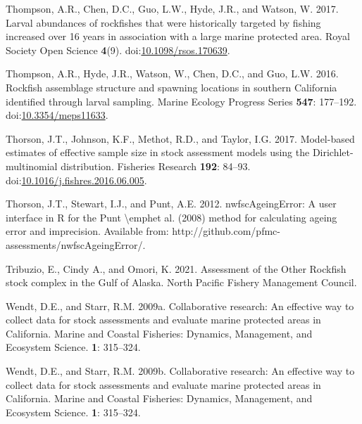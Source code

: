 \documentclass[11pt,
  english,
  letterpaper,
]{article}
\newlength{\cslhangindent}
\newenvironment{CSLReferences}[2] %
 {%
  \setlength{\parindent}{0pt}
  \ifodd #1 \everypar{\setlength{\hangindent}{\cslhangindent}}\ignorespaces\fi
  \ifnum #2 > 0
  \setlength{\parskip}{#2\baselineskip}
  \fi
 }%
 {}
\begin{document}
\begin{CSLReferences}{1}{0}
\leavevmode{}%
Thompson, A.R., Chen, D.C., Guo, L.W., Hyde, J.R., and Watson, W. 2017. Larval abundances of rockfishes that were historically targeted by fishing increased over 16 years in association with a large marine protected area. Royal Society Open Science \textbf{4}(9). doi:\href{https://doi.org/10.1098/rsos.170639}{10.1098/rsos.170639}.

\leavevmode{}%
Thompson, A.R., Hyde, J.R., Watson, W., Chen, D.C., and Guo, L.W. 2016. Rockfish assemblage structure and spawning locations in southern {California} identified through larval sampling. Marine Ecology Progress Series \textbf{547}: 177--192. doi:\href{https://doi.org/10.3354/meps11633}{10.3354/meps11633}.

\leavevmode{}%
Thorson, J.T., Johnson, K.F., Methot, R.D., and Taylor, I.G. 2017. Model-based estimates of effective sample size in stock assessment models using the {Dirichlet}-multinomial distribution. Fisheries Research \textbf{192}: 84--93. doi:\href{https://doi.org/10.1016/j.fishres.2016.06.005}{10.1016/j.fishres.2016.06.005}.

\leavevmode{}%
Thorson, J.T., Stewart, I.J., and Punt, A.E. 2012. {nwfscAgeingError}: A user interface in {R} for the {Punt} {\textbackslash{}}emphet al. (2008) method for calculating ageing error and imprecision. Available from: http://github.com/pfmc-assessments/nwfscAgeingError/.

\leavevmode{}%
Tribuzio, E., Cindy A., and Omori, K. 2021. Assessment of the {Other} {Rockfish} stock complex in the {Gulf} of {Alaska}. North Pacific Fishery Management Council.

\leavevmode{}%
Wendt, D.E., and Starr, R.M. 2009a. Collaborative research: An effective way to collect data for stock assessments and evaluate marine protected areas in {C}alifornia. Marine and Coastal Fisheries: Dynamics, Management, and Ecosystem Science. \textbf{1}: 315--324.

\leavevmode{}%
Wendt, D.E., and Starr, R.M. 2009b. Collaborative research: An effective way to collect data for stock assessments and evaluate marine protected areas in {California}. Marine and Coastal Fisheries: Dynamics, Management, and Ecosystem Science. \textbf{1}: 315--324.


\end{CSLReferences}
\end{document}
